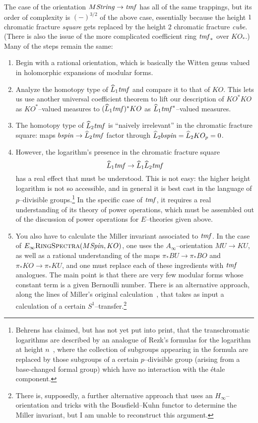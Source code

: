 The case of the orientation \(M\mathit{String} \to \mathit{tmf}\) has all of the same trappings, but its order of complexity is \((-)^{3/2}\) of the above case, essentially because the height \(1\) chromatic fracture \emph{square} gets replaced by the height \(2\) chromatic fracture \emph{cube}.  (There is also the issue of the more complicated coefficient ring \(\mathit{tmf}_*\) over \(KO_*\).)  Many of the steps remain the same:
\begin{enumerate}
    \item Begin with a rational orientation, which is basically the Witten genus valued in holomorphic expansions of modular forms.
    \item Analyze the homotopy type of \(\widehat L_1 \mathit{tmf}\) and compare it to that of \(KO\).  This lets us use another universal coefficient theorem to lift our description of \(KO^* KO\) as \(KO^*\)--valued measures to \((\widehat L_1 \mathit{tmf})^* KO\) as \(\widehat L_1 \mathit{tmf}^*\)--valued measures.
    \item The homotopy type of \(\widehat L_2 \mathit{tmf}\) is ``naively irrelevant'' in the chromatic fracture square: maps \(b\mathit{spin} \to \widehat L_2 \mathit{tmf}\) factor through \(\widehat L_2 b\mathit{spin} = \widehat L_2 KO_p = 0\).
    \item However, the logarithm's presence in the chromatic fracture square \[\widehat L_1 \mathit{tmf} \to \widehat L_1 \widehat L_2 \mathit{tmf}\] has a real effect that must be understood.  This is not easy: the higher height logarithm is not so accessible, and in general it is best cast in the language of \(p\)--divisible groups.\footnote{Behrens has claimed, but has not yet put into print, that the transchromatic logarithms are described by an analogue of Rezk's formulas for the logarithm at height \(n\)~\cite[Subsections 1.10 and 1.12]{RezkLogarithm}, where the collection of subgroups appearing in the formula are replaced by those subgroups of a certain \(p\)--divisible group (arising from a base-changed formal group) which have no interaction with the \'etale component.}  In the specific case of \(\mathit{tmf}\), it requires a real understanding of its theory of power operations, which must be assembled out of the discussion of power operations for \(E\)--theories given above.
    \item You also have to calculate the Miller invariant associated to \(\mathit{tmf}\).  In the case of \(E_\infty\normalfont\textsc{RingSpectra}(M\mathit{Spin}, KO)\), one uses the \(A_\infty\)--orientation \(MU \to KU\), as well as a rational understanding of the maps \(\pi_* BU \to \pi_* BO\) and \(\pi_* KO \to \pi_* KU\), and one must replace each of these ingredients with \(\mathit{tmf}\) analogues.  The main point is that there are very few modular forms whose constant term is a given Bernoulli number.  There is an alternative approach, along the lines of Miller's original calculation~\cite{MillerBernoulliNos}, that takes as input a calculation of a certain \(S^1\)--transfer.\footnote{There is, supposedly, a further alternative approach that uses an \(H_\infty\)--orientation and tricks with the Bousfield--Kuhn functor to determine the Miller invariant, but I am unable to reconstruct this argument.}

\end{enumerate}
